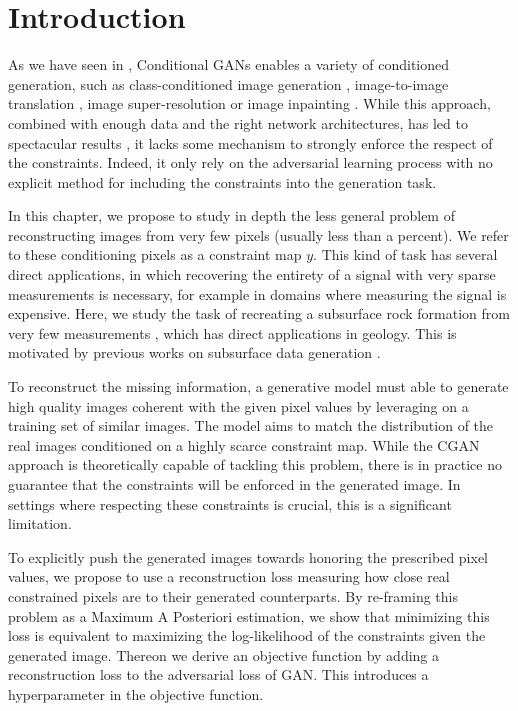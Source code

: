 \newpage
\minitoc

\section{Introduction}

As we have seen in , Conditional GANs enables a variety of conditioned generation, such as class-conditioned image generation \citep{Mirza2014}, image-to-image translation \citep{Isola2016, Wang2018}, image super-resolution \citep{Wang2020} or image inpainting \citep{Pathak2016}. While this approach, combined with enough data and the right network architectures, has led to spectacular results \citep{Karras2020}, it lacks some mechanism to strongly enforce the respect of the constraints. Indeed, it only rely on the adversarial learning process with no explicit method for including the constraints into the generation task.

In this chapter,  we propose to study in depth the less general problem of reconstructing images from very few pixels (usually less than a percent). We refer to these conditioning pixels as a constraint map $y$. This kind of task has several direct applications, in which recovering the entirety of a signal with very sparse measurements is necessary, for example in domains where measuring the signal is expensive. Here, we study the task of recreating a subsurface rock formation from very few measurements , which has direct applications in geology. This is motivated by previous works on subsurface data generation \citep{Laloy2018, Laloy2019}.

To reconstruct the missing information, a generative  model must able to generate high quality images coherent with the given pixel values by leveraging on a training set of similar images. The model aims to match the distribution of the real images conditioned on a highly scarce constraint map. While the \ac{CGAN} approach is theoretically capable of tackling this problem, there is in practice no guarantee that the constraints will be enforced in the generated image. In settings where respecting these constraints is crucial, this is a significant limitation.

To explicitly push the generated images towards honoring the prescribed pixel values, we propose to use a reconstruction loss measuring how close real constrained pixels are to their generated counterparts.  By re-framing this problem as a Maximum A Posteriori estimation, we show that minimizing this loss is equivalent to maximizing the log-likelihood of the constraints given the generated image. Thereon we derive an objective function by adding a reconstruction loss to the adversarial loss of \ac{GAN}. This introduces a hyperparameter in the objective function.


